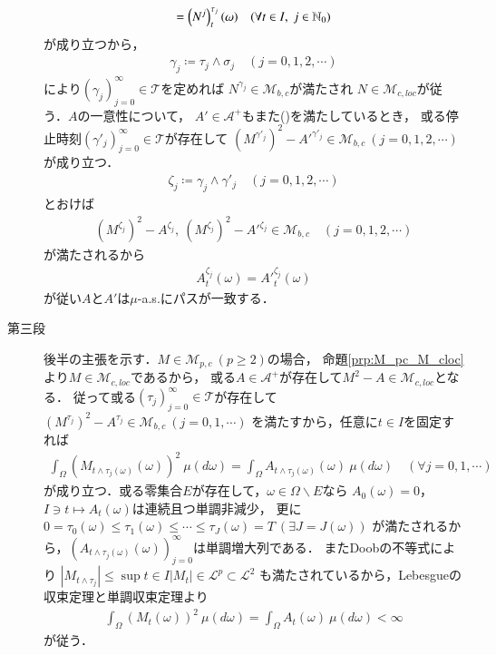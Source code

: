 \begin{prf}
\begin{description}
\begin{align}
					= \left( N^j \right)_t^{\tau_j}(\omega) \quad (\forall t \in I,\ j \in \mathbb{N}_0)
				\end{align}
				が成り立つから，
				\begin{align}
					\gamma_j \coloneqq \tau_j \wedge \sigma_j
					\quad (j=0,1,2,\cdots)
				\end{align}
				により$(\gamma_j)_{j=0}^{\infty} \in \mathcal{T}$を定めれば
				$N^{\gamma_j} \in \mathcal{M}_{b,c}$が満たされ
				$N \in \mathcal{M}_{c,loc}$が従う．$A$の一意性について，
				$A' \in \mathcal{A}^+$もまた()を満たしているとき，
				或る停止時刻$\left( \gamma'_j \right)_{j=0}^{\infty} \in \mathcal{T}$が存在して
				$\left( M^{\gamma'_j} \right)^2 - {A'}^{\gamma'_j} \in \mathcal{M}_{b,c}\ (j=0,1,2,\cdots)$が成り立つ．
				\begin{align}
					\zeta_j \coloneqq \gamma_j \wedge \gamma'_j
					\quad (j=0,1,2,\cdots)
				\end{align}
				とおけば
				\begin{align}
					\left( M^{\zeta_j} \right)^2 - A^{\zeta_j},\ \left( M^{\zeta_j} \right)^2 - {A'}^{\zeta_j} \in \mathcal{M}_{b,c}
					\quad (j=0,1,2,\cdots)
				\end{align}
				が満たされるから
				\begin{align}
					A_t^{\zeta_j} (\omega) = {A'}_t^{\zeta_j} (\omega)
				\end{align}
				が従い$A$と$A'$は$\mu$-a.s.にパスが一致する．
				
			\item[第三段]
				後半の主張を示す．$M \in \mathcal{M}_{p,c}\ (p \geq 2)$の場合，
				命題\ref{prp:M_pc_M_cloc}より$M \in \mathcal{M}_{c,loc}$であるから，
				或る$A \in \mathcal{A}^+$が存在して$M^2 - A \in \mathcal{M}_{c,loc}$となる．
				従って或る$(\tau_j)_{j=0}^{\infty} \in \mathcal{T}$が存在して
				$\left(M^{\tau_j} \right)^2 - A^{\tau_j} \in \mathcal{M}_{b,c}\ (j=0,1,\cdots)$
				を満たすから，任意に$t \in I$を固定すれば
				\begin{align}
					\int_{\Omega} \left( M_{t \wedge \tau_j(\omega)}(\omega) \right)^2\ \mu(d\omega)
					= \int_{\Omega} A_{t \wedge \tau_j(\omega)}(\omega)\ \mu(d\omega)
					\quad (\forall j=0,1,\cdots)
				\end{align}
				が成り立つ．或る零集合$E$が存在して，$\omega \in \Omega \backslash E$なら
				$A_0(\omega) = 0$，$I \ni t \longmapsto A_t(\omega)$は連続且つ単調非減少，
				更に$0 = \tau_0(\omega) \leq \tau_1(\omega) \leq \cdots \leq \tau_{J}(\omega) = T\ (\exists J = J(\omega))$
				が満たされるから，$\left(A_{t \wedge \tau_j(\omega)}(\omega)\right)_{j=0}^{\infty}$は単調増大列である．
				またDoobの不等式により
				$\left| M_{t \wedge \tau_j} \right| \leq \sup{t \in I}{|M_t|} \in \mathscr{L}^p \subset \mathscr{L}^2$
				も満たされているから，Lebesgueの収束定理と単調収束定理より
				\begin{align}
					\int_{\Omega} \left( M_t(\omega) \right)^2\ \mu(d\omega)
					= \int_{\Omega} A_t(\omega)\ \mu(d\omega) < \infty
				\end{align}
				が従う．
			

\end{description}
\end{prf}
